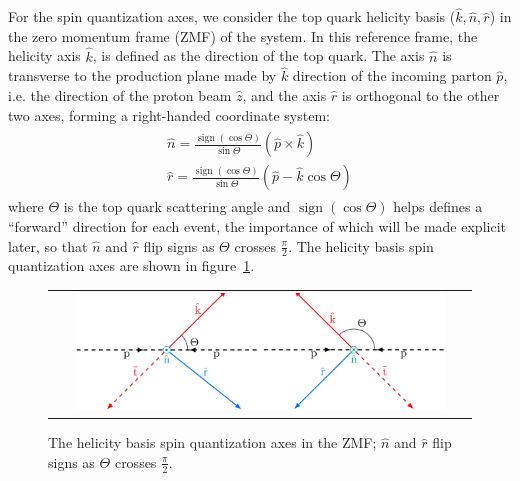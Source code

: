 For the spin quantization axes, we consider the top quark helicity basis ($\hat{k}, \hat{n}, \hat{r}$) in the zero momentum frame (ZMF) of the \ttbar system.
In this reference frame, the helicity axis $\hat{k}$, is defined as the direction of the top quark.
The axis $\hat{n}$ is transverse to the production plane made by $\hat{k}$ direction of the incoming parton $\hat{p}$, i.e. the direction of the proton beam $\hat{z}$, and the axis $\hat{r}$ is orthogonal to the other two axes, forming a right-handed coordinate system:
\begin{align}
\begin{array}{c}
\hat{n}=\frac{\operatorname{sign}(\cos \Theta)}{\sin \Theta}(\hat{p} \times \hat{k}) \\
\hat{r}=\frac{\operatorname{sign}(\cos \Theta)}{\sin \Theta}(\hat{p} - \hat{k}\cos \Theta)
\end{array}
\label{helcity_basis}
\end{align}
where $\Theta$ is the top quark scattering angle and $\operatorname{sign}(\cos \Theta)$ helps defines a “forward” direction for each event, the importance of which will be made explicit later, so that $\hat{n}$ and $\hat{r}$ flip signs as $\Theta$ crosses $\frac{\pi}{2}$.
The helicity basis spin quantization axes are shown in figure~\ref{helicity_basis}.
\begin{figure}[!h]
  \begin{center}
    \begin{tabular}{c}
        \includegraphics[width=0.9\textwidth]{fig_TopQuark/helicity_basis.png}
    \end{tabular}
    \caption{The helicity basis spin quantization axes in the \ttbar ZMF;
            $\hat{n}$ and $\hat{r}$ flip signs as $\Theta$ crosses $\frac{\pi}{2}$.
            }
    \label{helicity_basis}
  \end{center}
\end{figure}

